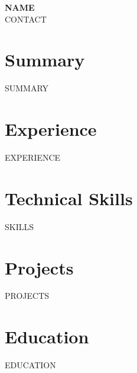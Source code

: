 \documentclass[10pt,letterpaper]{article}
\begin{document}
\begin{center}
  {\LARGE \textbf{{{NAME}}}}\\[3pt]
  {\small {{CONTACT}}}
\end{center}

\vspace{4pt}

\section*{Summary}
{{SUMMARY}}

\section*{Experience}
{{EXPERIENCE}}

\section*{Technical Skills}
{{SKILLS}}

\section*{Projects}
{{PROJECTS}}

\section*{Education}
{{EDUCATION}}
\end{document}
